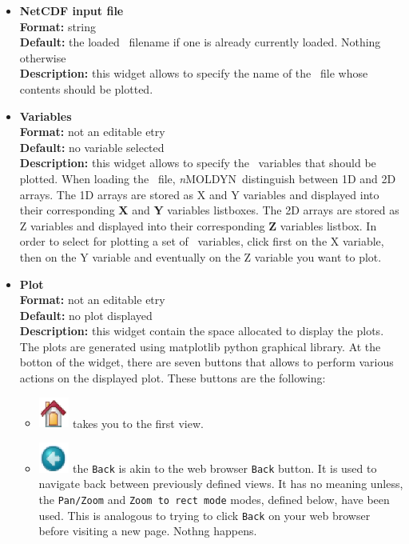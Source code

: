 \documentclass[a4paper,11pt]{report}
\newcommand{\NMOLDYN}{\textit{n}MOLDYN}
\begin{document}
\begin{itemize}
\item \textbf{NetCDF input file}\\
\textbf{Format:} string\\
\textbf{Default:} the loaded \NetCDF\ filename if one is already currently loaded. Nothing otherwise\\
\textbf{Description:} this widget allows to specify the name of the \NetCDF\ file whose contents should be plotted.

\item \textbf{Variables}\\
\textbf{Format:} not an editable etry\\
\textbf{Default:} no variable selected\\
\textbf{Description:} this widget allows to specify the \NetCDF\ variables that should be plotted. When loading the \NetCDF\ 
file, \NMOLDYN\ distinguish between 1D and 2D arrays. The 1D arrays are stored as X and Y variables and displayed into 
their corresponding \textbf{X} and \textbf{Y} variables listboxes. The 2D arrays are stored as Z variables and displayed into 
their corresponding \textbf{Z} variables listbox. In order to select for plotting a set of \NetCDF\ variables, click first on the X variable, 
then on the Y variable and eventually on the Z variable you want to plot.

\item \textbf{Plot}\\
\textbf{Format:} not an editable etry\\
\textbf{Default:} no plot displayed\\
\textbf{Description:} this widget contain the space allocated to display the plots. The plots are generated using 
matplotlib python graphical library. At the botton of the widget, there are seven buttons that allows to perform 
various actions on the displayed plot. These buttons are the following:
\begin{itemize}
\item \includegraphics[width=1cm]{Figures/matplotlib_home.eps} takes you to the first view.

\item \includegraphics[width=1cm]{Figures/matplotlib_back.eps} the \texttt{Back} is akin to the web browser 
\texttt{Back} button. It is used to navigate back between previously defined views. It has no meaning unless, 
the \texttt{Pan/Zoom} and \texttt{Zoom to rect mode} modes, defined below, have been used. This is analogous to trying to 
click \texttt{Back} on your web browser before visiting a new page. Nothng happens.


\end{itemize}
\end{itemize}
\end{document}
